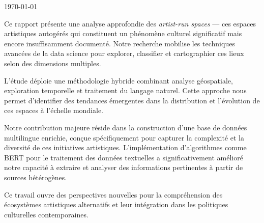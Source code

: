 \documentclass[mstat,12pt]{unswthesis}
\begin{document}
{\bigskip\bigskip\bigskip\noindent} \today




\vspace{2cm}

\begin{center}
\begin{minipage}{0.85\textwidth}
\setlength{\parindent}{0pt}
\setlength{\parskip}{0.5em}

Ce rapport présente une analyse approfondie des \textit{artist-run spaces} — ces espaces artistiques autogérés qui constituent un phénomène culturel significatif mais encore insuffisamment documenté. Notre recherche mobilise les techniques avancées de la data science pour explorer, classifier et cartographier ces lieux selon des dimensions multiples.

L'étude déploie une méthodologie hybride combinant analyse géospatiale, exploration temporelle et traitement du langage naturel. Cette approche nous permet d'identifier des tendances émergentes dans la distribution et l'évolution de ces espaces à l'échelle mondiale.

Notre contribution majeure réside dans la construction d'une base de données multilingue enrichie, conçue spécifiquement pour capturer la complexité et la diversité de ces initiatives artistiques. L'implémentation d'algorithmes comme BERT pour le traitement des données textuelles a significativement amélioré notre capacité à extraire et analyser des informations pertinentes à partir de sources hétérogènes.

Ce travail ouvre des perspectives nouvelles pour la compréhension des écosystèmes artistiques alternatifs et leur intégration dans les politiques culturelles contemporaines.

\end{minipage}
\end{center}

\vspace{2cm}

\par




\afterpreface

\listoffigures
\listoftables




%
%
\end{document}
